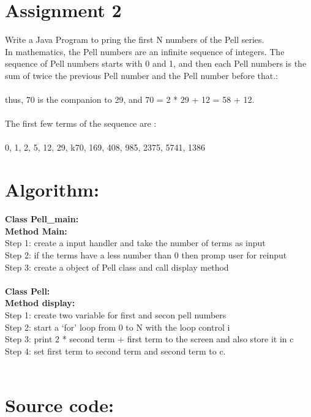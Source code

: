 \section*{\centering Assignment 2}
\vspace{15px}
Write a Java Program to pring the first N numbers of the Pell series.\\
In mathematics, the Pell numbers are an infinite sequence of integers. The sequence of Pell 
numbers starts with 0 and 1, and then each Pell numbers is the sum of twice the previous Pell number 
and the Pell number before that.:\\\\
thus, 70 is the companion to 29, and 70 = 2 * 29 + 12 = 58 + 12.\\\\
The first few terms of the sequence are :\\\\
0, 1, 2, 5, 12, 29, k70, 169, 408, 985, 2375, 5741, 1386

\section*{Algorithm:}
\textbf{\color{javapurple}Class Pell\_main:}\\
\textbf{Method Main:}\\
Step 1: create a input handler and take the number of terms as input \\
Step 2: if the terms have a less number than 0 then promp user for reinput \\
Step 3: create a object of Pell class and call display method\\\\
\textbf{\color{javapurple}Class Pell:}\\
\textbf{Method display:}\\
Step 1: create two variable for first and secon pell numbers\\
Step 2: start a `for' loop from 0 to N with the loop control i\\
Step 3: print 2 * second term + first term to the screen and also store it in c\\
Step 4: set first term to second term and second term to c.\\\\

\section*{Source code:}



